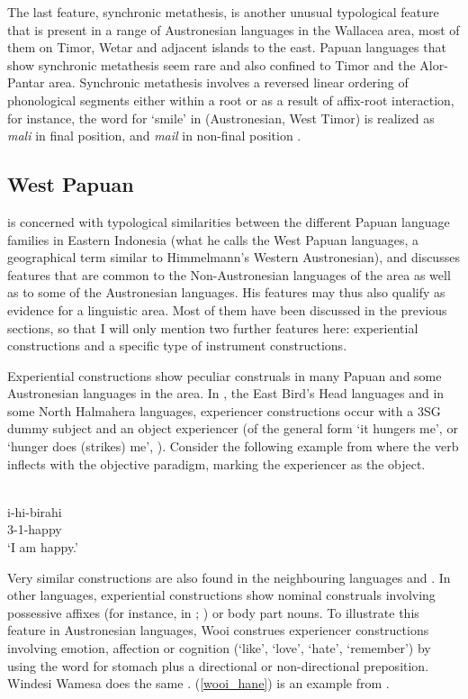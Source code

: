 The last feature, synchronic metathesis, is another unusual typological feature that is present in a range of Austronesian languages in the Wallacea area, most of them on Timor, Wetar and adjacent islands to the east. Papuan languages that show synchronic metathesis seem rare and also confined to Timor and the Alor-Pantar area. Synchronic metathesis involves a reversed linear ordering of phonological segments either within a root or as a result of affix-root interaction, for instance, the word for `smile' in  (Austronesian, West Timor) is realized as \textit{mali} in final position, and \textit{mail} in non-final position \citep[134ff.]{schapper2015wallacea}.

\subsection{West Papuan}\label{sec:westpapuan}

\citet{reesink2005west} is concerned with typological similarities between the different Papuan language families in Eastern Indonesia (what he calls the West Papuan languages, a geographical term similar to Himmelmann's Western Austronesian), and discusses features that are common to the Non-Austronesian languages of the area as well as to some of the Austronesian languages. His features may thus also qualify as evidence for a linguistic area. Most of them have been discussed in the previous sections, so that I will only mention two further features here: experiential constructions and a specific type of instrument constructions. 

Experiential constructions show peculiar construals in many Papuan and some Austronesian languages in the area. In , the East Bird's Head languages and in some North Halmahera languages, experiencer constructions occur with a 3SG dummy subject and an object experiencer  (of the general form `it hungers me', or `hunger does (strikes) me', \citealt[191]{reesink2005west}). Consider the following example from  where the verb inflects with the objective paradigm, marking the experiencer as the object.

\ea 
{}\\
\gll i-hi-birahi \\
3-1-happy \\
\glft `I am happy.'\\ 
\z

Very similar constructions are also found in the neighbouring languages  and . In other languages, experiential constructions show nominal construals involving possessive affixes (for instance, in ; \citealt[192]{reesink2005west}) or body part nouns. To illustrate this feature in Austronesian languages, Wooi construes experiencer constructions involving emotion, affection or cognition (`like', `love', `hate', `remember') by using the word for stomach plus a directional or non-directional preposition. Windesi Wamesa does the same \citep[154]{gasser2014windesi}. (\ref{wooi_hane}) is an example from .

